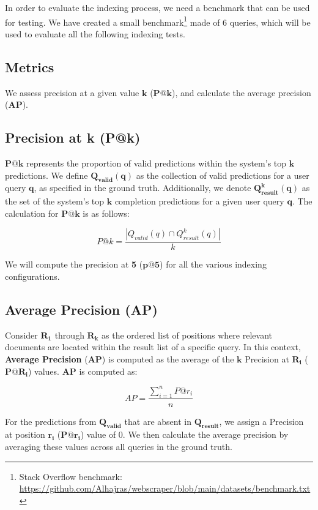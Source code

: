 {In order to evaluate the indexing process, we need a benchmark that can be used for testing. We have created a small benchmark\footnote{Stack Overflow benchmark: \url{https://github.com/Alhajras/webscraper/blob/main/datasets/benchmark.txt}} made of 6 queries, which will be used to evaluate all the following indexing tests.

\subsection{Metrics}
We assess precision at a given value $\bm{k}$ ($\bm{P@k}$), and calculate the average precision ($\bm{AP}$).

\subsection*{Precision at k (P@k)}
$\bm{P@k}$ represents the proportion of valid predictions within the system's top $\bm{k}$ predictions. We define $\bm{Q_{valid}(q)}$ as the collection of valid predictions for a user query $\bm{q}$, as specified in the ground truth. Additionally, we denote $\bm{Q^k_{result}(q)}$ as the set of the system's top $\bm{k}$ completion predictions for a given user query $\bm{q}$. The calculation for $\bm{P@k}$ is as follows:

\begin{equation}
P@k = \frac{|Q_{valid}(q) \cap Q^k_{result}(q)|}{k}
\label{eq:patq}
\end{equation}

We will compute the precision at \textbf{5} ($\bm{p@5}$) for all the various indexing configurations.

\subsection*{Average Precision (AP)}
Consider $\bm{R_1}$ through $\bm{R_k} $ as the ordered list of positions where relevant documents are located within the result list of a specific query. In this context, \textbf{Average Precision} ($\bm{AP}$) is computed as the average of the $\bm{k}$ Precision at $\bm{R_i}$ ($\bm{P@R_i}$) values. $\bm{AP}$ is computed as:

\begin{equation}
AP = \frac{\sum_{i=1}^{n} P@r_i}{n}
\label{eq:ap}
\end{equation}

For the predictions from $\bm{Q_{valid}}$ that are absent in $\bm{Q_{result}}$, we assign a Precision at position $\bm{r_i} $ ($\bm{P@r_i}$) value of 0. We then calculate the average precision by averaging these values across all queries in the ground truth.

}
